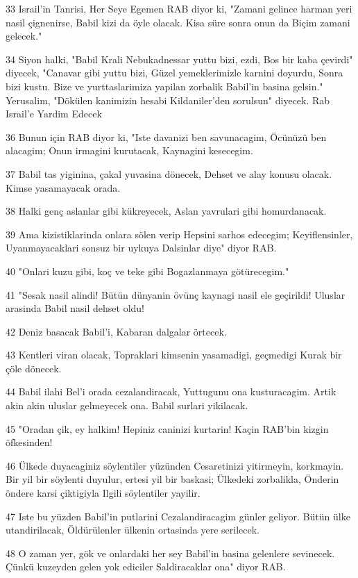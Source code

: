 \par 33 Israil'in Tanrisi, Her Seye Egemen RAB diyor ki, "Zamani gelince harman yeri nasil çignenirse, Babil kizi da öyle olacak. Kisa süre sonra onun da Biçim zamani gelecek."
\par 34 Siyon halki, "Babil Krali Nebukadnessar yuttu bizi, ezdi, Bos bir kaba çevirdi" diyecek, "Canavar gibi yuttu bizi, Güzel yemeklerimizle karnini doyurdu, Sonra bizi kustu. Bize ve yurttaslarimiza yapilan zorbalik Babil'in basina gelsin." Yerusalim, "Dökülen kanimizin hesabi Kildaniler'den sorulsun" diyecek. Rab Israil'e Yardim Edecek
\par 36 Bunun için RAB diyor ki, "Iste davanizi ben savunacagim, Öcünüzü ben alacagim; Onun irmagini kurutacak, Kaynagini kesecegim.
\par 37 Babil tas yiginina, çakal yuvasina dönecek, Dehset ve alay konusu olacak. Kimse yasamayacak orada.
\par 38 Halki genç aslanlar gibi kükreyecek, Aslan yavrulari gibi homurdanacak.
\par 39 Ama kizistiklarinda onlara sölen verip Hepsini sarhos edecegim; Keyiflensinler, Uyanmayacaklari sonsuz bir uykuya Dalsinlar diye" diyor RAB.
\par 40 "Onlari kuzu gibi, koç ve teke gibi Bogazlanmaya götürecegim."
\par 41 "Sesak nasil alindi! Bütün dünyanin övünç kaynagi nasil ele geçirildi! Uluslar arasinda Babil nasil dehset oldu!
\par 42 Deniz basacak Babil'i, Kabaran dalgalar örtecek.
\par 43 Kentleri viran olacak, Topraklari kimsenin yasamadigi, geçmedigi Kurak bir çöle dönecek.
\par 44 Babil ilahi Bel'i orada cezalandiracak, Yuttugunu ona kusturacagim. Artik akin akin uluslar gelmeyecek ona. Babil surlari yikilacak.
\par 45 "Oradan çik, ey halkim! Hepiniz caninizi kurtarin! Kaçin RAB'bin kizgin öfkesinden!
\par 46 Ülkede duyacaginiz söylentiler yüzünden Cesaretinizi yitirmeyin, korkmayin. Bir yil bir söylenti duyulur, ertesi yil bir baskasi; Ülkedeki zorbalikla, Önderin öndere karsi çiktigiyla Ilgili söylentiler yayilir.
\par 47 Iste bu yüzden Babil'in putlarini Cezalandiracagim günler geliyor. Bütün ülke utandirilacak, Öldürülenler ülkenin ortasinda yere serilecek.
\par 48 O zaman yer, gök ve onlardaki her sey Babil'in basina gelenlere sevinecek. Çünkü kuzeyden gelen yok ediciler Saldiracaklar ona" diyor RAB.
